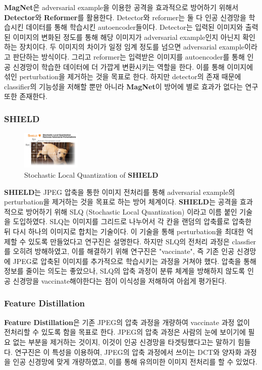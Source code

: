 \documentclass{article}
\begin{document}
\textbf{MagNet}은 adversarial example을 이용한 공격을 효과적으로 방어하기 위해서 \textbf{Detector}와 \textbf{Reformer}를 활용한다.\cite{carlini2017magnet} Detector와 reformer는 둘 다 인공 신경망을 학습시킨 데이터를 통해 학습시킨 autoencoder들이다. Detector는 입력된 이미지와 출력된 이미지의 변화된 정도를 통해 해당 이미지가 adversarial example인지 아닌지 확인하는 장치이다. 두 이미지의 차이가 일정 임계 정도를 넘으면 adversarial example이라고 판단하는 방식이다. 그리고 reformer는 입력받은 이미지를 autoencoder를 통해 인공 신경망이 학습한 데이터에 더 가깝게 변환시키는 역할을 한다. 이를 통해 이미지에 섞인 perturbation을 제거하는 것을 목표로 한다. 하지만 detector의 존재 때문에 classifier의 기능성을 저해할 뿐만 아니라 \textbf{MagNet}이 방어에 별로 효과가 없다는 연구\cite{carlini2017magnet} 또한 존재한다.

\subsubsection{SHIELD}

\begin{figure}
    \centering
    \includegraphics[width=0.25\textwidth]{images/shield-example.png}
    \caption{Stochastic Local Quantization of \textbf{SHIELD} \cite{das2018shield}}
\end{figure}

\textbf{SHIELD}는 JPEG 압축을 통한 이미지 전처리를 통해 adversarial example의 perturbation을 제거하는 것을 목표로 하는 방어 체계이다.\cite{das2018shield} \textbf{SHIELD}는 공격을 효과적으로 방어하기 위해 SLQ (Stochastic Local Quantization) 이라고 이름 붙인 기술을 도입하였다. SLQ는 이미지를 그리드로 나누어서 각 칸을 랜덤의 압축률로 압축한 뒤 다시 하나의 이미지로 합치는 기술이다. 이 기술을 통해 perturbation을 최대한 억제할 수 있도록 만들었다고 연구진은 설명한다. 하지만 SLQ의 전처리 과정은 classfier를 오히려 방해하였고, 이를 해결하기 위해 연구진은 "vaccinate", 즉 기존 인공 신경망에 JPEG로 압축된 이미지를 추가적으로 학습시키는 과정을 거쳐야 했다. 압축을 통해 정보를 줄이는 의도는 좋았으나, SLQ의 압축 과정이 분류 체계을 방해하지 않도록 인공 신경망을 vaccinate해야한다는 점이 이식성을 저해하여 아쉽게 평가된다.

\subsubsection{Feature Distillation}
\textbf{Feature Distillation}은 기존 JPEG의 압축 과정을 개량하여 vaccinate 과정 없이 전처리할 수 있도록 함을 목표로 한다.\cite{liu2019feature} JPEG의 압축 과정은 사람의 눈에 보이기에 필요 없는 부분을 제거하는 것이지, 이것이 인공 신경망을 타겟팅했다고는 말하기 힘들다. 연구진은 이 특성을 이용하여, JPEG의 압축 과정에서 쓰이는 DCT와 양자화 과정을 인공 신경망에 맞게 개량하였고, 이를 통해 유의미한 이미지 전처리를 할 수 있었다.
\end{document}
